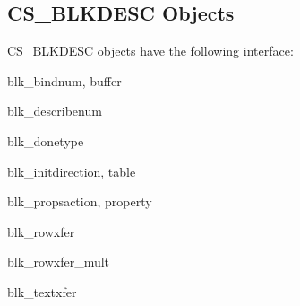 \subsection{CS_BLKDESC Objects}

CS_BLKDESC objects have the following interface:

\begin{methoddesc}[CS_BLKDESC]{blk_bind}{num, buffer}
\end{methoddesc}

\begin{methoddesc}[CS_BLKDESC]{blk_describe}{num}
\end{methoddesc}

\begin{methoddesc}[CS_BLKDESC]{blk_done}{type}
\end{methoddesc}

\begin{methoddesc}[CS_BLKDESC]{blk_init}{direction, table}
\end{methoddesc}

\begin{methoddesc}[CS_BLKDESC]{blk_props}{action, property }
\end{methoddesc}

\begin{methoddesc}[CS_BLKDESC]{blk_rowxfer}{}
\end{methoddesc}

\begin{methoddesc}[CS_BLKDESC]{blk_rowxfer_mult}{}
\end{methoddesc}

\begin{methoddesc}[CS_BLKDESC]{blk_textxfer}{}
\end{methoddesc}
